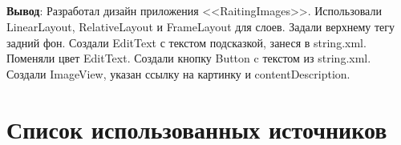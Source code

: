 \documentclass[12pt, a4paper, simple]{eskdtext}
\begin{document}

    \subparagraph{} \hspace{0pt}

    \textbf{Вывод}: Разработал дизайн приложения <<RaitingImages>>.
    Использовали LinearLayout, RelativeLayout и FrameLayout для слоев.
    Задали верхнему тегу задний фон.
    Создали EditText с текстом подсказкой, занеся в string.xml. Поменяли цвет EditText.
    Создали кнопку Button c текстом из string.xml.
    Создали ImageView, указан ссылку на картинку и contentDescription.

    \newpage

    \section*{Список использованных источников}
\end{document}

